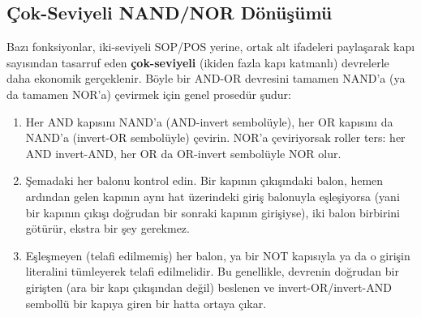 \subsection{Çok-Seviyeli NAND/NOR Dönüşümü}\label{sec:nandnor-cok-seviyeli}
Bazı fonksiyonlar, iki-seviyeli SOP/POS yerine, ortak alt ifadeleri paylaşarak kapı
sayısından tasarruf eden \textbf{çok-seviyeli} (ikiden fazla kapı katmanlı) devrelerle
daha ekonomik gerçeklenir. Böyle bir AND-OR devresini tamamen NAND'a (ya da tamamen
NOR'a) çevirmek için genel prosedür şudur:
\begin{enumerate}[nosep, leftmargin=*]
    \item Her AND kapısını NAND'a (AND-invert sembolüyle), her OR kapısını da NAND'a
    (invert-OR sembolüyle) çevirin. NOR'a çeviriyorsak roller ters: her AND
    invert-AND, her OR da OR-invert sembolüyle NOR olur.
    \item Şemadaki her balonu kontrol edin. Bir kapının çıkışındaki balon, hemen ardından
    gelen kapının aynı hat üzerindeki giriş balonuyla eşleşiyorsa (yani bir kapının
    çıkışı doğrudan bir sonraki kapının girişiyse), iki balon birbirini götürür, ekstra
    bir şey gerekmez.
    \item Eşleşmeyen (telafi edilmemiş) her balon, ya bir NOT kapısıyla ya da o girişin
    literalini tümleyerek telafi edilmelidir. Bu genellikle, devrenin doğrudan bir
    girişten (ara bir kapı çıkışından değil) beslenen ve invert-OR/invert-AND sembollü
    bir kapıya giren bir hatta ortaya çıkar.
\end{enumerate}

